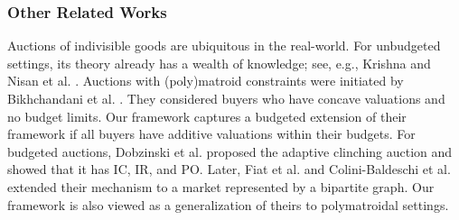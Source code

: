 \documentclass[letterpaper,11pt]{article}
\begin{document}
\begin{comment}
{\it Tight sets lemma} is a powerful tool for efficiency guarantees of polyhedral clinching auctions, 
which characterizes the dropping of buyers and the final allocation. 
We establish the first tight sets lemma for the indivisible settings. 
Although we deal with hard budget constraints as in Goel et al. \cite{GMP2015}, 
due to the indivisibility, the tight sets lemma in \cite{GMP2015}, 
who deal with our divisible version, cannot be formulated. 
Therefore, we use the analysis of Goel et al. \cite{GMP2014}, who deal with concave budget constraints in the divisible settings, and obtain the sharp tight sets lemma as theirs. 


Even with our new tight sets lemma, another technical difficulty of indivisibility prevents a straightforward adaptation of the above efficiency guarantees, especially the LW guarantee. In the divisible setting, Sato \cite{S2023} provided a lower bound on the total payment via the LW optimal allocation since the total payment is a lower bound on LW. However, the LW optimal allocation does not fit in our indivisible setting. Instead, we divide each buyer into two {\it virtual buyers} and use the LW optimal allocation for virtual buyers to establish a sharp lower bound on the total payment.
\end{comment}

\subsubsection*{Other Related Works}

Auctions of indivisible goods are ubiquitous in the real-world. For unbudgeted settings, its theory already has a wealth of knowledge; see, e.g., Krishna \cite{K2010} and Nisan et al. \cite{NRTV2007}. Auctions with (poly)matroid constraints were initiated by Bikhchandani et al. \cite{BSV2011}. They considered buyers who have concave valuations and no budget limits. Our framework captures a budgeted extension of their framework if all buyers have additive valuations within their budgets. For budgeted auctions, Dobzinski et al. \cite{DLN2012} proposed the adaptive clinching auction and showed that it has IC, IR, and PO. Later, Fiat et al. \cite{FLSS2011} and Colini-Baldeschi et al. \cite{BHLS2015} extended their mechanism to a market represented by a bipartite graph. Our framework is also viewed as a generalization of theirs to polymatroidal settings.
\end{document}
